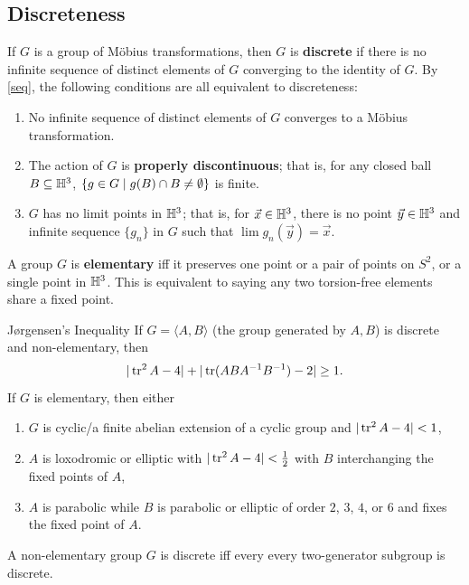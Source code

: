 \subsection{Discreteness}
If $G$ is a group of M\"obius transformations, then $G$ is \textbf{discrete} if there is no infinite sequence of distinct elements of $G$ converging to the identity of $G$. By \cref{seq}, the following conditions are all equivalent to discreteness:
\begin{enumerate}[label=(\roman*)]
    \item No infinite sequence of distinct elements of $G$ converges to a M\"obius transformation.
    \item The action of $G$ is \textbf{properly discontinuous}; that is, for any closed ball $B \subseteq \mathbb{H}^3$, $\{g \in G\mid g(B)\cap B\neq \emptyset\} $ is finite.
    \item $G$ has no limit points in $\mathbb{H}^3$; that is, for $\vec x \in \mathbb{H}^3$, there is no point $\vec y \in \mathbb{H}^3$ and infinite sequence $\{g_n \} $ in $G$ such that $\lim g_n (\vec y)=\vec x$.
\end{enumerate}
A group $G$ is \textbf{elementary} iff it preserves one point or a pair of points on $S^2$, or a single point in $\mathbb{H}^3$. This is equivalent to saying any two torsion-free elements share a fixed point. 
\begin{namedthm}{J\o{}rgensen's Inequality} 
    If $G=\langle A,B \rangle $ (the group generated by $A,B$) is discrete and non-elementary, then \[
        | \operatorname{tr} ^2 A- 4| + |\operatorname{tr} (ABA^{-1}B^{-1})-2| \geq 1.
    \] If $G$ is elementary, then either 
    \begin{enumerate}[label=(\roman*)]
    \setlength\itemsep{-.2em}
\item $G$ is cyclic/a finite abelian extension of a cyclic group and $|\operatorname{tr} ^2 A-4|<1$,
\item $A$ is loxodromic or elliptic with $|\operatorname{tr} ^2A-4| < \frac{1}{2}$ with $B$ interchanging the fixed points of $A$,
\item $A$ is parabolic while $B$ is parabolic or elliptic of order $2$, $3$, $4$, or $6$ and fixes the fixed point of $A$.
    \end{enumerate}
\end{namedthm}
\begin{cor}
    A non-elementary group $G$ is discrete iff every every two-generator subgroup is discrete. 
\end{cor}

